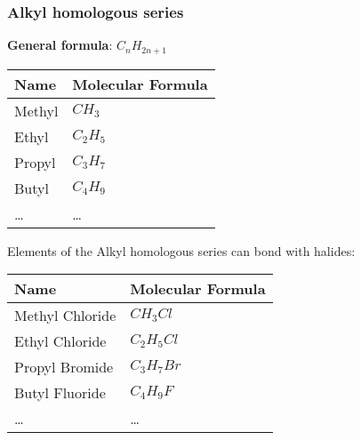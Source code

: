 \documentclass[11pt]{article}
\begin{document}
\subsubsection{Alkyl homologous series}
\label{sec:org347c0d9}
\textbf{General formula}: \(C_nH_{2n+1}\)
\begin{center}
\begin{tabular}{ll}
Name & Molecular Formula\\
\hline
Methyl & \(CH_3\)\\
Ethyl & \(C_2H_5\)\\
Propyl & \(C_3H_7\)\\
Butyl & \(C_4H_9\)\\
\ldots{} & \ldots{}\\
\end{tabular}
\end{center}
Elements of the Alkyl homologous series can bond with halides:
\begin{center}
\begin{tabular}{ll}
Name & Molecular Formula\\
\hline
Methyl Chloride & \(CH_3Cl\)\\
Ethyl Chloride & \(C_2H_5Cl\)\\
Propyl Bromide & \(C_3H_7Br\)\\
Butyl Fluoride & \(C_4H_9F\)\\
\ldots{} & \ldots{}\\
\end{tabular}
\end{center}
\end{document}
